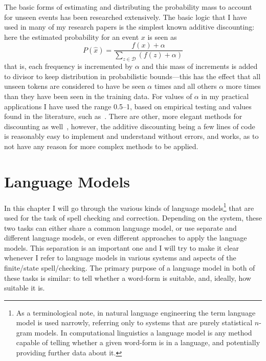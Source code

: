 \documentclass[officiallayout]{unihelcompling}
\begin{document}
The basic forms of estimating and distributing the probability mass to account
for unseen events has been researched extensively. The basic logic that I have
used in many of my research papers is the simplest known additive discounting:
here the estimated probability for an event $x$ is seen as \begin{equation}
P(\hat{x}) = \frac{f(x) + \alpha}{\sum_{z \in \mathcal{D}}(f(z) + \alpha)}
\end{equation} that is, each frequency is incremented by $\alpha$ and this mass
of increments is added to divisor to keep distribution in probabilistic
bounds---this has the effect that all unseen tokens are considered to have be
seen $\alpha$ times and all others $\alpha$ more times than they have been seen
in the training data.  For values of $\alpha$ in my practical applications I
have used the range 0.5--1, based on empirical testing and values found in the
literature, such as~\citet{manning1999foundations}. There are other, more
elegant methods for discounting as well~\citep{chen1999empirical}, however,
the additive discounting being a few lines of code is reasonably easy to
implement and understand without errors, and works, as to not have any reason
for more complex methods to be applied.


\chapter{Language Models}
\label{chap:language-models}

In this chapter I will go through the various kinds of
\glspl{language model}\footnote{As a terminological note, in \gls{natural language
    engineering} the term language model is used narrowly, referring only
    to systems that are purely statistical \(n\)-gram models. In
    computational linguistics a language model is any method capable of
    telling whether a given word-form is in a language, and potentially
    providing further data about it.} that are
used for the task of spell checking and correction.  Depending on the system,
these two tasks can either share a common language model, or use separate and
different language models, or even different approaches to apply the language
models. This separation is an important one and I will try to make it clear
whenever I refer to language models in various systems and aspects of the
finite\-/state spell\-/checking.  The primary purpose of a language model in
both of these tasks is similar: to tell whether a word-form is suitable, and,
ideally, how suitable it is.
\end{document}
